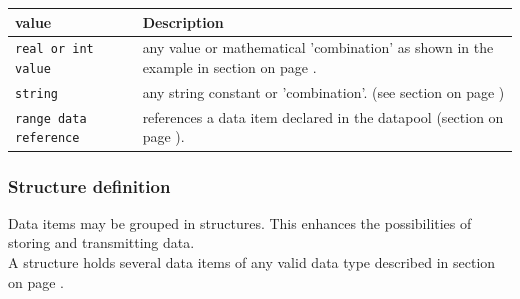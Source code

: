 


\begin{tabularx}{\textwidth}{l|X}
value                    & Description \\
\hline
\verb+real or int value+ & any value or mathematical 'combination' as shown in the example
                           in section \nameref{sec:scale} on page \pageref{sec:scale}. \\
\verb+string+            & any string constant or 'combination'.
                           (see section \nameref{sec:string} on page
                           \pageref{sec:string}) \\
\verb+range data reference+ & references a data item declared in the datapool
                             (section \nameref{sec:rangedatareference} on page
                              \pageref{sec:rangedatareference}). \\
\end{tabularx}
\vspace{0.5cm}

\begin{boxedminipage}[t]{\linewidth}
\end{boxedminipage}

\newpage
\subsubsection{Structure definition}
\label{sec:dpstruct}
Data items may be grouped in structures. This enhances the possibilities
of storing and transmitting data. \\
A structure holds several data items of any valid data type described in
section  on page \pageref{sec:dpitem}.

